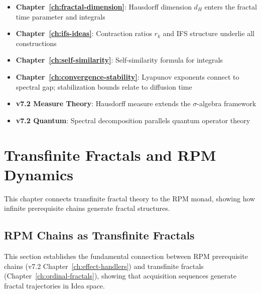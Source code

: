 \begin{remark}
\label{rem:math-ch6-connections}
\begin{itemize}
  \item \textbf{Chapter~\ref{ch:fractal-dimension}}: Hausdorff dimension $d_H$ enters the fractal time parameter and integrals
  \item \textbf{Chapter~\ref{ch:ifs-ideas}}: Contraction ratios $r_k$ and IFS structure underlie all constructions
  \item \textbf{Chapter~\ref{ch:self-similarity}}: Self-similarity formula for integrals
  \item \textbf{Chapter~\ref{ch:convergence-stability}}: Lyapunov exponents connect to spectral gap; stabilization bounds relate to diffusion time
  \item \textbf{v7.2 Measure Theory}: Hausdorff measure extends the $\sigma$-algebra framework
  \item \textbf{v7.2 Quantum}: Spectral decomposition parallels quantum operator theory
\end{itemize}
\end{remark}

\chapter{Transfinite Fractals and RPM Dynamics}
\label{ch:fractals-rpm}

\begin{tcolorbox}[colback=blue!5!white,colframe=blue!75!black,title=\vnewthree]
This chapter connects transfinite fractal theory to the RPM monad, showing how infinite prerequisite chains generate fractal structures.
\end{tcolorbox}

\section{RPM Chains as Transfinite Fractals}
\label{sec:rpm-transfinite}

\begin{tcolorbox}[colback=blue!5!white,colframe=blue!75!black,title=\vnewthree]
This section establishes the fundamental connection between RPM prerequisite chains (v7.2 Chapter~\ref*{ch:effect-handlers}) and transfinite fractals (Chapter~\ref{ch:ordinal-fractals}), showing that acquisition sequences generate fractal trajectories in Idea space.
\end{tcolorbox}

